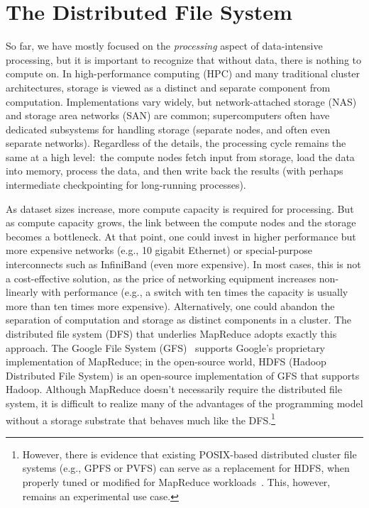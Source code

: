 \section{The Distributed File System}
\label{chapter2:dfs}

So far, we have mostly focused on the \emph{processing} aspect of
data-intensive processing, but it is important to recognize that
without data, there is nothing to compute on.  In high-performance
computing (HPC) and many traditional cluster architectures, storage is
viewed as a distinct and separate component from computation.
Implementations vary widely, but network-attached storage (NAS) and
storage area networks (SAN) are common; supercomputers often have
dedicated subsystems for handling storage (separate nodes, and often
even separate networks).  Regardless of the details, the processing
cycle remains the same at a high level:\ the compute nodes fetch input
from storage, load the data into memory, process the data, and then
write back the results (with perhaps intermediate checkpointing for
long-running processes).

As dataset sizes increase, more compute capacity is required for
processing.  But as compute capacity grows, the link between the
compute nodes and the storage becomes a bottleneck.  At that point,
one could invest in higher performance but more expensive networks
(e.g., 10 gigabit Ethernet) or special-purpose interconnects such as
InfiniBand (even more expensive).  In most cases, this is not a
cost-effective solution, as the price of networking equipment
increases non-linearly with performance (e.g., a switch with ten times
the capacity is usually more than ten times more expensive).
Alternatively, one could abandon the separation of computation and
storage as distinct components in a cluster.  The distributed file
system (DFS) that underlies MapReduce adopts exactly this approach.
The Google File System (GFS)~\cite{Ghemawat_etal_SOSP2003} supports
Google's proprietary implementation of MapReduce; in the open-source
world, HDFS (Hadoop Distributed File System) is an open-source
implementation of GFS that supports Hadoop.  Although MapReduce
doesn't necessarily require the distributed file system, it is
difficult to realize many of the advantages of the programming model
without a storage substrate that behaves much like the
DFS.\footnote{However, there is evidence that existing POSIX-based
distributed cluster file systems (e.g., GPFS or PVFS) can serve as a
replacement for HDFS, when properly tuned or modified for MapReduce
workloads~\cite{Tantisiriroj_etal_2008,Ananthanarayanan_etal_2009}.
This, however, remains an experimental use case.}

